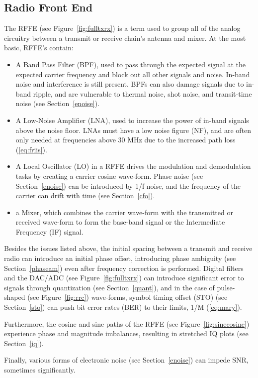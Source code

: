 \subsection{Radio Front End}
\label{rffe}
The RFFE (see Figure~\ref{fig:fulltxrx}) is a term used to group all of the analog circuitry between a transmit or receive chain's antenna and mixer. At the most basic, RFFE's contain:
\begin{itemize}
\item A Band Pass Filter (BPF), used to pass through the expected signal at the expected carrier frequency and block out all other signals and noise. In-band noise and interference is still present. BPFs can also damage signals due to in-band ripple, and are vulnerable to thermal noise, shot noise, and transit-time noise (see Section~\ref{enoise}).
\item A Low-Noise Amplifier (LNA), used to increase the power of in-band signals above the noise floor. LNAs must have a low noise figure (NF), and are often only needed at frequencies above 30 MHz due to the increased path loss (\ref{eq:friis}).
\item A Local Oscillator (LO) in a RFFE drives the modulation and demodulation tasks by creating a carrier cosine wave-form. Phase noise (see Section~\ref{enoise}) can be introduced by 1/f noise, and the frequency of the carrier can drift with time (see Section~\ref{cfo}).
\item a Mixer, which combines the carrier wave-form with the transmitted or received wave-form to form the base-band signal or the Intermediate Frequency (IF) signal.
\end{itemize}

Besides the issues listed above, the initial spacing between a transmit and receive radio can introduce an initial phase offset, introducing phase ambiguity (see Section~\ref{phaseam}) even after frequency correction is performed. Digital filters and the DAC/ADC (see Figure~\ref{fig:fulltxrx}) can introduce significant error to signals through quantization (see Section~\ref{quant}), and in the case of pulse-shaped (see Figure~\ref{fig:rrc}) wave-forms, symbol timing offset (STO) (see Section~\ref{sto}) can push bit error rates (BER) to their limits, 1/M (\ref{eq:mary}).

Furthermore, the cosine and sine paths of the RFFE (see Figure~\ref{fig:sinecosine}) experience phase and magnitude imbalances, resulting in stretched IQ plots (see Section~\ref{iq}).

Finally, various forms of electronic noise (see Section~\ref{enoise}) can impede SNR, sometimes significantly.
